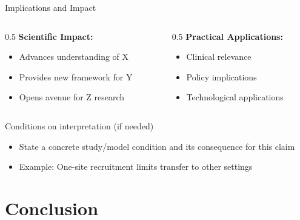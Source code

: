 \documentclass[aspectratio=169,11pt]{beamer}
\begin{document}
\begin{frame}{Implications and Impact}
  \begin{columns}[T]

    \begin{column}{0.5\textwidth}
      \textbf{Scientific Impact:}
      \begin{itemize}
        \item Advances understanding of X
        \item Provides new framework for Y
        \item Opens avenue for Z research
      \end{itemize}
    \end{column}

    \begin{column}{0.5\textwidth}
      \textbf{Practical Applications:}
      \begin{itemize}
        \item Clinical relevance
        \item Policy implications
        \item Technological applications
      \end{itemize}
    \end{column}

  \end{columns}

  \vspace{0.5cm}

  \begin{block}{Conditions on interpretation (if needed)}
    \begin{itemize}
      \item State a concrete study/model condition and its consequence for this claim
      \item Example: One-site recruitment limits transfer to other settings
    \end{itemize}
  \end{block}
\end{frame}


\section{Conclusion}
\end{document}
